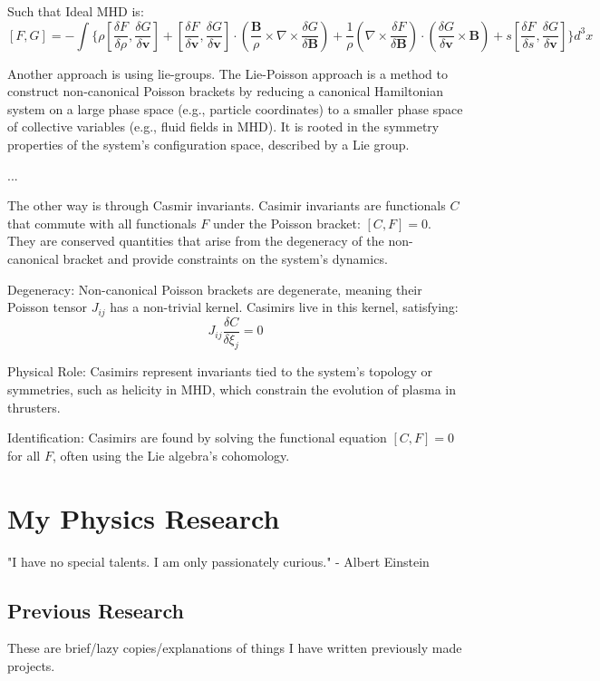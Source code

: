 \par Such that Ideal MHD is:
$$[F, G] = -\int \Bigg\{
\rho \left[ \frac{\delta F}{\delta \rho}, \frac{\delta G}{\delta \mathbf{v}} \right]
+ \left[ \frac{\delta F}{\delta \mathbf{v}}, \frac{\delta G}{\delta \mathbf{v}} \right] \cdot \left( \frac{\mathbf{B}}{\rho} \times \nabla \times \frac{\delta G}{\delta \mathbf{B}} \right)
+ \frac{1}{\rho} \left( \nabla \times \frac{\delta F}{\delta \mathbf{B}} \right) \cdot \left( \frac{\delta G}{\delta \mathbf{v}} \times \mathbf{B} \right)
+ s \left[ \frac{\delta F}{\delta s}, \frac{\delta G}{\delta \mathbf{v}} \right]
\Bigg\} d^3x$$
\par Another approach is using lie-groups. The Lie-Poisson approach is a method to construct non-canonical Poisson brackets by reducing a canonical Hamiltonian system on a large phase space (e.g., particle coordinates) to a smaller phase space of collective variables (e.g., fluid fields in MHD). It is rooted in the symmetry properties of the system’s configuration space, described by a Lie group.
\par ...
\par The other way is through Casmir invariants. Casimir invariants are functionals $C$ that commute with all functionals $F$ under the Poisson bracket: $[C, F] = 0$. They are conserved quantities that arise from the degeneracy of the non-canonical bracket and provide constraints on the system’s dynamics.
\par Degeneracy: Non-canonical Poisson brackets are degenerate, meaning their Poisson tensor $J_{ij}$ has a non-trivial kernel. Casimirs live in this kernel, satisfying:
$$J_{ij} \frac{\delta C}{\delta \xi_j} = 0$$

\par Physical Role: Casimirs represent invariants tied to the system’s topology or symmetries, such as helicity in MHD, which constrain the evolution of plasma in thrusters.
\par Identification: Casimirs are found by solving the functional equation $[C, F] = 0$ for all $F$, often using the Lie algebra’s cohomology.
\par 
\chapter{My Physics Research}
"I have no special talents. I am only passionately curious." - Albert Einstein
\section{Previous Research}
\par These are brief/lazy copies/explanations of things I have written previously made projects.
